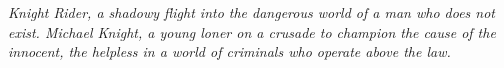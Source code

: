 %
%
\chapter*{}

\begin{flushright}
	{\it Knight Rider, a shadowy flight into the dangerous world of a man who does not exist. Michael Knight, a young loner on a crusade to champion the cause of the innocent, the helpless in a world of criminals who operate above the law.}
\end{flushright}
